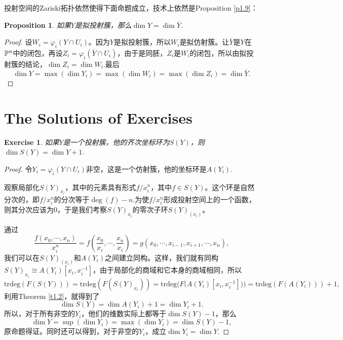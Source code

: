 \documentclass[9pt]{extarticle}
\theoremstyle{plain}%
\newtheorem{pro}[defi]{Proposition}%
\newtheorem{exe}{Exercise}[section]%
\begin{document}
投射空间的Zariski拓扑依然使得下面命题成立，技术上依然是Proposition \ref{p1.9}：
\begin{pro}如果$Y$是拟投射簇，那么$\dim Y=\dim \bar{Y}$.\end{pro}
\begin{proof}
设$W_i=\varphi_i(Y\cap U_i)$。因为$Y$是拟投射簇，所以$W_i$是拟仿射簇。让$\bar{Y}$是$Y$在$\mathbb{P}^n$中的闭包，再设$Z_i=\varphi_i(\bar{Y}\cap U_i)$，由于是同胚，$Z_i$是$W_i$的闭包，所以由拟投射簇的结论，$\dim Z_i=\dim W_i$.最后
\[
	\dim Y=\max(\dim Y_i)=\max(\dim W_i)=\max(\dim Z_i)=\dim \bar{Y}.
\]
\end{proof}

\section*{The Solutions of Exercises}
\setcounter{exe}{5}
\begin{exe}
	如果$Y$是一个投射簇，他的齐次坐标环为$S(Y)$，则$\dim S(Y)=\dim Y+1$.
	\label{c2:e6}
\end{exe}
\begin{proof}
	令$Y_i=\varphi_i(Y\cap U_i)$非空，这是一个仿射簇，他的坐标环是$A(Y_i)$.

	观察局部化$S(Y)_{x_i}$，其中的元素具有形式$f/x_i^n$，其中$f\in S(Y)$。这个环是自然分次的，即$f/x_i^n$的分次等于$\deg(f)-n$.为使$f/x_i^n$形成投射空间上的一个函数，则其分次应该为$0$，于是我们考察$S(Y)_{x_i}$的零次子环$S(Y)_{(x_i)}$。

	通过
	\[
		\frac{f(x_0,\cdots,x_n)}{x_i^n}=f\left(\frac{x_0}{x_i},\cdots,\frac{x_n}{x_i}\right)=g(x_0,\cdots,x_{i-1},x_{i+1},\cdots,x_n),
	\]
	我们可以在$S(Y)_{(x_i)}$和$A(Y_i)$之间建立同构。这样，我们就有同构$S(Y)_{x_i}\cong A(Y_i)[x_i,x_i^{-1}]$，由于局部化的商域和它本身的商域相同，所以
	\[
	\mathrm{trdeg}(F(S(Y)))=\mathrm{trdeg}(F(S(Y)_{x_i}))=\mathrm{trdeg}\bigl(F\bigl(A(Y_i)[x_i,x_i^{-1}]\bigr)\bigr)=\mathrm{trdeg}(F(A(Y_i)))+1,
	\]
	利用Theorem \ref{t1.2}，就得到了
	\[
		\dim S(Y)=\dim A(Y_i)+1=\dim Y_i+1.
	\]
	所以，对于所有非空的$Y_i$，他们的维数实际上都等于$\dim S(Y)-1$，那么
	\[
		\dim Y=\sup (\dim Y_i)=\max (\dim Y_i)=\dim S(Y)-1,
	\]
	原命题得证。同时还可以得到，对于非空的$Y_i$，成立$\dim Y_i=\dim Y$.
\end{proof}
\end{document}
